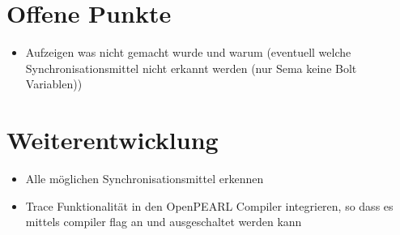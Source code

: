 \section{Offene Punkte}
\begin{itemize}
  \item Aufzeigen was nicht gemacht wurde und warum (eventuell welche
  Synchronisationsmittel nicht erkannt werden (nur Sema keine Bolt Variablen))
\end{itemize}

\section{Weiterentwicklung}
\begin{itemize}
  \item Alle möglichen Synchronisationsmittel erkennen
  \item Trace Funktionalität in den OpenPEARL Compiler integrieren, so dass es
  mittels compiler flag an und ausgeschaltet werden kann
\end{itemize}